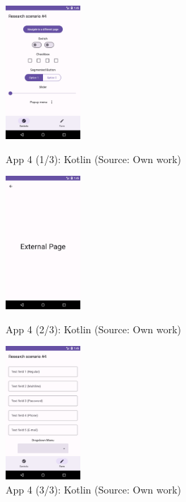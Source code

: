 \begin{figure}[H]
  \begin{minipage}{.31\textwidth}
    \centering
    \includegraphics[height=50mm]{img/app4_1_kotlin}
    \caption{App 4 (1/3): Kotlin (Source: Own work)}
    \label{fig:app4_1_kotlin}
  \end{minipage}
  \hfill
  \begin{minipage}{.31\textwidth}
    \centering
    \includegraphics[height=50mm]{img/app4_2_kotlin}
    \caption{App 4 (2/3): Kotlin (Source: Own work)}
    \label{fig:app4_2_kotlin}
  \end{minipage}
  \hfill
  \begin{minipage}{.31\textwidth}
    \centering
    \includegraphics[height=50mm]{img/app4_3_kotlin}
    \caption{App 4 (3/3): Kotlin (Source: Own work)}
    \label{fig:app4_3_kotlin}
  \end{minipage}
\end{figure}

